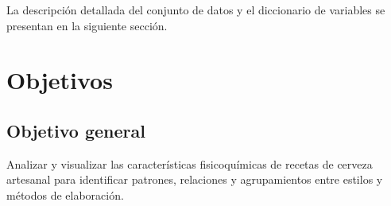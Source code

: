 \documentclass[11pt]{article}
\begin{document}
La descripción detallada del conjunto de datos y el diccionario de variables se
presentan en la siguiente sección.


\section{Objetivos}

\subsection*{Objetivo general}
Analizar y visualizar las características fisicoquímicas de recetas de cerveza artesanal
para identificar patrones, relaciones y agrupamientos entre estilos y métodos de elaboración.
\end{document}
